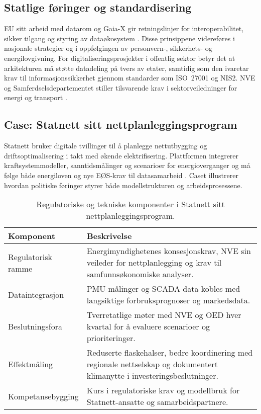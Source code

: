 \subsection{Statlige føringer og standardisering}
EU sitt arbeid med datarom og Gaia-X gir retningslinjer for interoperabilitet, sikker tilgang og styring av dataøkosystem \citep{eu2020circulareconomy}. Disse prinsippene videreføres i nasjonale strategier og i oppfølgingen av personvern-, sikkerhets- og energilovgivning. For digitaliseringsprosjekter i offentlig sektor betyr det at arkitekturen må støtte datadeling på tvers av etater, samtidig som den ivaretar krav til informasjonssikkerhet gjennom standarder som ISO~27001 og NIS2. NVE og Samferdselsdepartementet stiller tilsvarende krav i sektorveiledninger for energi og transport \citep{nve2023nettplan,avinor2022digital}.

\subsection{Case: Statnett sitt nettplanleggingsprogram}
Statnett bruker digitale tvillinger til å planlegge nettutbygging og driftsoptimalisering i takt med økende elektrifisering. Plattformen integrerer kraftsystemmodeller, sanntidsmålinger og scenarioer for energioverganger og må følge både energiloven og nye EØS-krav til datasamarbeid \citep{statnett2023digital}. Caset illustrerer hvordan politiske føringer styrer både modellstrukturen og arbeidsprosessene.

\begin{table}[ht]
    \centering
    \caption{Regulatoriske og tekniske komponenter i Statnett sitt nettplanleggingsprogram.}
    \label{tab:kap02-statnett}
    \begin{tabular}{p{}p{}}
        \toprule
        \textbf{Komponent} & \textbf{Beskrivelse} \\
        \midrule
        Regulatorisk ramme & Energimyndighetenes konsesjonskrav, NVE sin veileder for nettplanlegging og krav til samfunnsøkonomiske analyser. \\
        Dataintegrasjon & PMU-målinger og SCADA-data kobles med langsiktige forbruksprognoser og markedsdata. \\
        Beslutningsfora & Tverretatlige møter med NVE og OED hver kvartal for å evaluere scenarioer og prioriteringer. \\
        Effektmåling & Reduserte flaskehalser, bedre koordinering med regionale nettselskap og dokumentert klimanytte i investeringsbeslutninger. \\
        Kompetansebygging & Kurs i regulatoriske krav og modellbruk for Statnett-ansatte og samarbeidspartnere. \\
        \bottomrule
    \end{tabular}
\end{table}

